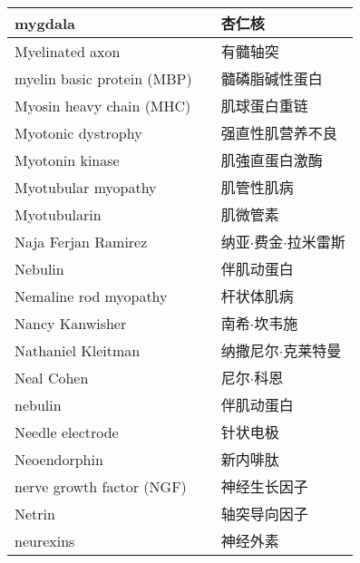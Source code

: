 \begin{longtable}{lll}
	\midrule
	mygdala     && 杏仁核   \\
	
	\midrule
	Myelinated axon     && 有髓轴突   \\
	
	\midrule
	myelin basic protein (MBP)     && 髓磷脂碱性蛋白   \\
	
	\midrule
	Myosin heavy chain (MHC)    && 肌球蛋白重链   \\
	
	\midrule
	Myotonic dystrophy    && 强直性肌营养不良   \\
	
	\midrule
	Myotonin kinase    && 肌強直蛋白激酶   \\
	
	\midrule
	Myotubular myopathy    && 肌管性肌病   \\
	
	\midrule
	Myotubularin    && 肌微管素   \\
	
	\midrule
	Naja Ferjan Ramirez   &&  纳亚$\cdot$费金$\cdot$拉米雷斯 \\
	
	\midrule
	Nebulin   &&  伴肌动蛋白 \\
	
	\midrule
	Nemaline rod myopathy   &&  杆状体肌病 \\
	
	\midrule
	Nancy Kanwisher   &&  南希$\cdot$坎韦施 \\
	
	\midrule
	Nathaniel Kleitman   &&  纳撒尼尔$\cdot$克莱特曼 \\
	
	\midrule
	Neal Cohen   &&  尼尔$\cdot$科恩 \\
	
	\midrule
	nebulin   &&  伴肌动蛋白 \\
	
	\midrule
	Needle electrode   &&  针状电极 \\
	
	\midrule
	Neoendorphin   &&  新内啡肽 \\
	
	\midrule
	nerve growth factor (NGF)   &&  神经生长因子 \\
	
	\midrule
	Netrin   &&  轴突导向因子 \\
	
	\midrule
	neurexins   &&  神经外素 \\
	

\end{longtable}

